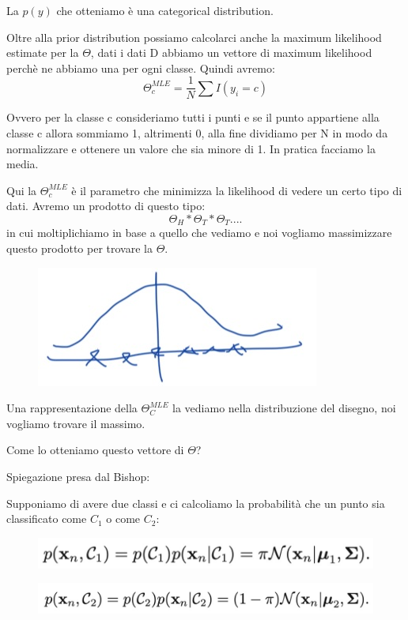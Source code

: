 \documentclass[14pt]{extreport}
\begin{document}
La $p(y)$ che otteniamo è una categorical distribution.

Oltre alla prior distribution possiamo calcolarci anche la maximum likelihood estimate per la $\Theta$, dati i dati D abbiamo un vettore di maximum
likelihood perchè ne abbiamo una per ogni classe. Quindi avremo: $$\Theta_c^{MLE} = \frac{1}{N}\sum I(y_i = c)$$

Ovvero per la classe c consideriamo tutti i punti e se il punto appartiene alla classe c allora sommiamo 1, altrimenti 0, alla fine dividiamo per N in
modo da normalizzare e ottenere un valore che sia minore di 1. In pratica facciamo la media.


Qui la $\Theta_c^{MLE}$ è il parametro che minimizza la likelihood di vedere un certo tipo di dati. Avremo un prodotto di questo tipo:
$$\Theta_H*\Theta_T*\Theta_T....$$ in cui moltiplichiamo in base a quello che vediamo e noi vogliamo massimizzare questo prodotto per trovare la
$\Theta$.
\begin{figure}[H]
	\centering
	\includegraphics[width=0.4\linewidth]{175.jpeg}
\end{figure}

Una rappresentazione della $\Theta_C^{MLE}$ la vediamo nella distribuzione del disegno, noi vogliamo trovare il massimo.


Come lo otteniamo questo vettore di $\Theta$?

Spiegazione presa dal Bishop:

Supponiamo di avere due classi e ci calcoliamo la probabilità che un punto sia classificato come $C_1$ o come $C_2$:

\begin{figure}[H]
	\centering
	\includegraphics[width=0.7\linewidth]{202.jpeg}
\end{figure}
\begin{figure}[H]
	\centering
	\includegraphics[width=0.7\linewidth]{203.jpeg}
\end{figure}
\end{document}

